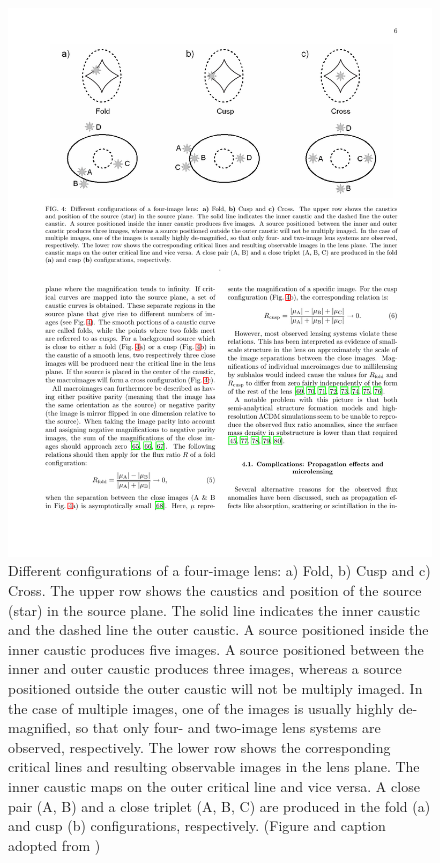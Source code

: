 \documentclass[paper=a4, fontsize=11pt]{scrartcl} %
\numberwithin{equation}{section} %
\numberwithin{figure}{section} %
\numberwithin{table}{section} %
\begin{document}
 \begin{figure}[ht]
 \label{fig:cusps}
 \centering
 \includegraphics[width=1.0\textwidth]{figs/zack09_4}
 \caption{Different configurations of a four-image lens: a) Fold, b) Cusp and c) Cross. The upper row shows the caustics and position of the source (star) in the source plane. The solid line indicates the inner caustic and the dashed line the outer caustic. A source positioned inside the inner caustic produces five images. A source positioned between the inner and outer caustic produces three images, whereas a source positioned outside the outer caustic will not be multiply imaged. In the case of multiple images, one of the images is usually highly de-magnified, so that only four- and two-image lens systems are observed, respectively. The lower row shows the corresponding critical lines and resulting observable images in the lens plane. The inner caustic maps on the outer critical line and vice versa. A close pair (A, B) and a close triplet (A, B, C) are produced in the fold (a) and cusp (b) configurations, respectively. (Figure and caption adopted from \citet{Zackrisson.Riehm2010})}
 \end{figure} 
\end{document}
